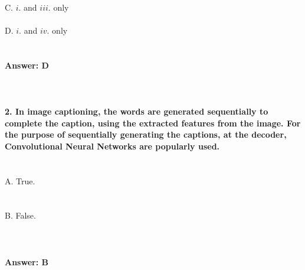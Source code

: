 \documentclass[prl,twocolumn,showpacs,preprintnumbers,superscriptaddress]{revtex4}
\theoremstyle{plain}
\theoremstyle{definition}
\begin{document}
\begin{widetext}
\\
C. $i.$ and $iii.$ only
\\
\\
D. $i.$ and $iv.$ only
\\
\\
\\
\textbf{Answer: D}
\\
\\
\\
\\
\textbf{2. In image captioning, the words are generated sequentially to complete the caption, using the extracted features from the image. For the purpose of sequentially generating the captions, at the decoder, Convolutional Neural Networks are popularly used.}
\\
\\
\\
A. True.
\\
\\
\\
B. False.
\\
\\
\\
\\
\textbf{Answer: B}
\\
\\
\\
\\

\end{widetext}
\end{document}
